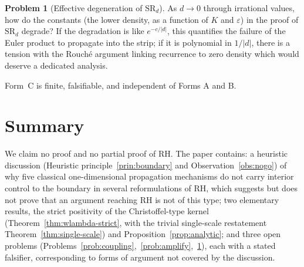 \documentclass[11pt]{amsart}
\theoremstyle{definition}
\newtheorem{problem}[theorem]{Problem}
\theoremstyle{remark}
\begin{document}
\begin{problem}[Effective degeneration of $\mathrm{SR}_d$]\label{prob:effective}
As $d\to0$ through irrational values, how do the constants (the lower density, as a function of
$K$ and $\varepsilon$) in the proof of $\mathrm{SR}_d$ degrade? If the degradation is like
$e^{-c/|d|}$, this quantifies the failure of the Euler product to propagate into the strip; if it
is polynomial in $1/|d|$, there is a tension with the Rouch\'e argument linking recurrence to zero
density which would deserve a dedicated analysis.
\end{problem}

Form~C is finite, falsifiable, and independent of Forms A and B.

\section{Summary}\label{sec:assessment}

We claim no proof and no partial proof of RH. The paper contains: a heuristic discussion
(Heuristic principle~\ref{prin:boundary} and Observation~\ref{obs:nogo}) of why five classical
one-dimensional propagation mechanisms do not carry interior control to the boundary in several
reformulations of RH, which suggests but does not prove that an argument reaching RH is not of
this type; two elementary results, the strict positivity of the Christoffel-type kernel
(Theorem~\ref{thm:wlambda-strict}, with the trivial single-scale restatement
Theorem~\ref{thm:single-scale}) and Proposition~\ref{prop:analytic}; and three open problems
(Problems~\ref{prob:coupling},~\ref{prob:amplify},~\ref{prob:effective}), each with a stated
falsifier, corresponding to forms of argument not covered by the discussion.
\end{document}
